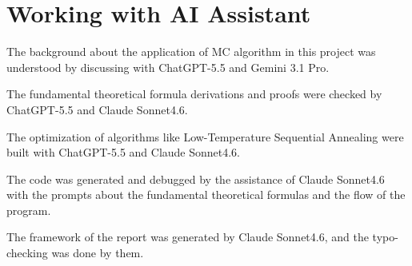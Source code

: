 \documentclass[12pt, a4paper]{article}
\theoremstyle{definition}
\begin{document}
\section{Working with AI Assistant}
\label{app:ai}

\hfill

The background about the application of MC algorithm in this project was understood by discussing with ChatGPT-5.5 and Gemini 3.1 Pro.

The fundamental theoretical formula derivations and proofs were checked by ChatGPT-5.5 and Claude Sonnet4.6.

The optimization of algorithms like Low-Temperature Sequential Annealing were built with ChatGPT-5.5 and Claude Sonnet4.6.

The code was generated and debugged by the assistance of Claude Sonnet4.6 with the prompts about the fundamental theoretical formulas and the flow of the program.

The framework of the report was generated by Claude Sonnet4.6, and the typo-checking was done by them.
\end{document}
